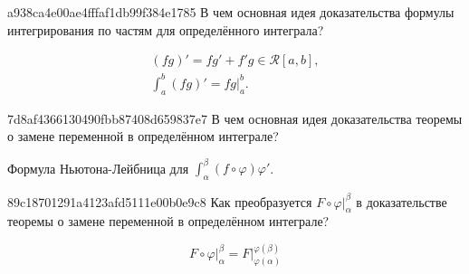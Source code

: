 \begin{note}{a938ca4e00ae4fffaf1db99f384e1785}
    В чем основная идея доказательства формулы интегрирования по частям для определённого интеграла?

    \begin{cloze}{1}
        \[
            \begin{gathered}
                (fg)' = f g' + f' g \in \mathcal R[a, b], \\
                \int_{a}^{b} (fg)' = fg \big|_{a}^{b}.
            \end{gathered}
        \]
    \end{cloze}
\end{note}


\begin{note}{7d8af4366130490fbb87408d659837e7}
    В чем основная идея доказательства теоремы о замене переменной в определённом интеграле?

    \begin{cloze}{1}
        Формула Ньютона-Лейбница для \({ \int_{\alpha}^{\beta} (f \circ \varphi) \varphi' }\).
    \end{cloze}
\end{note}

\begin{note}{89c18701291a4123afd5111e00b0e9c8}
    Как преобразуется \({ F \circ \varphi \big|_{\alpha}^{\beta} }\) в доказательстве теоремы о замене переменной в определённом интеграле?

    \begin{cloze}{1}
        \[
            F \circ \varphi \big|_{\alpha}^{\beta} = F \big|_{\varphi(\alpha)}^{\varphi(\beta)}
        \]
    \end{cloze}
\end{note}

